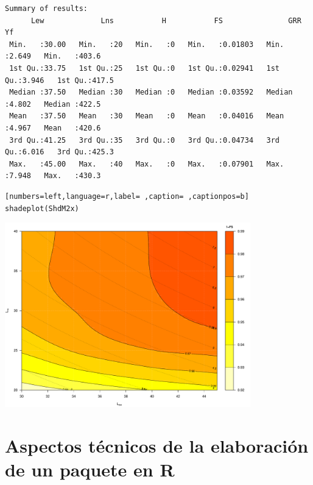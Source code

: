 \begin{verbatim}
Summary of results:
      Lew             Lns           H           FS               GRR              Yf       
 Min.   :30.00   Min.   :20   Min.   :0   Min.   :0.01803   Min.   :2.649   Min.   :403.6  
 1st Qu.:33.75   1st Qu.:25   1st Qu.:0   1st Qu.:0.02941   1st Qu.:3.946   1st Qu.:417.5  
 Median :37.50   Median :30   Median :0   Median :0.03592   Median :4.802   Median :422.5  
 Mean   :37.50   Mean   :30   Mean   :0   Mean   :0.04016   Mean   :4.967   Mean   :420.6  
 3rd Qu.:41.25   3rd Qu.:35   3rd Qu.:0   3rd Qu.:0.04734   3rd Qu.:6.016   3rd Qu.:425.3  
 Max.   :45.00   Max.   :40   Max.   :0   Max.   :0.07901   Max.   :7.948   Max.   :430.3
\end{verbatim}

\begin{lstlisting}[numbers=left,language=r,label= ,caption= ,captionpos=b]
shadeplot(ShdM2x)
\end{lstlisting}

\begin{center}
\includegraphics[width=0.8\textwidth]{figuras/codigo-optimshd.pdf}
\end{center}


\section{Aspectos técnicos de la elaboración de un paquete en R}
\label{sec:org08f1c37}
\label{sec:aspectos-tecnicos}
